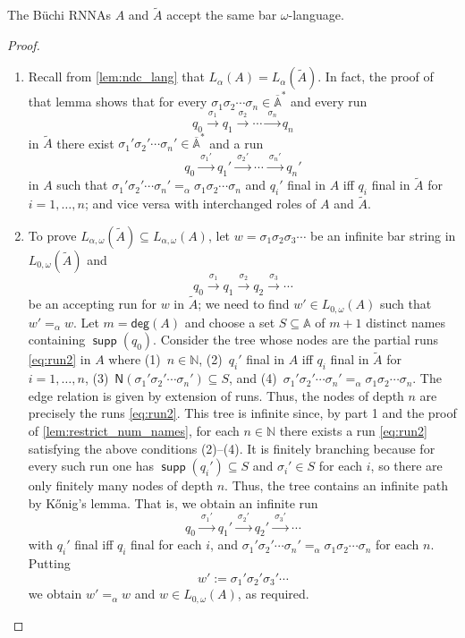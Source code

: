 \documentclass[10pt,a4paper]{amsart}
\newcommand{\Names}[1]{\mathsf{N}(#1)}
\newcommand{\degree}{\mathsf{deg}}
\newcommand{\barA}{\overline{\names}}
\numberwithin{equation}{section}
\newcommand{\xto}[1]{\xrightarrow{~#1~}}
\newcommand{\seq}{\subseteq}
\newcommand{\tl}{\widetilde}
\newcommand{\Nat}{{\mathbb{N}}}
\newcommand{\+}[1]{\mathcal{#1}\xspace}
\newcommand{\names}{\mathbb{A}}
\DeclareMathOperator{\supp}{\mathsf{supp}} %
\theoremstyle{definition}
\begin{document}
%
\begin{lemma}\label{lem:alpha_lang_buechi}
  The Büchi RNNAs $A$ and $\tl A$ accept the same bar
  $\omega$-language.%
\end{lemma}
%
\begin{proof}
  \begin{enumerate}
  \item Recall from \autoref{lem:ndc_lang} that
    $L_\alpha(A)=L_\alpha(\tl{A})$. In fact, the proof of that lemma
    shows that for every $\sigma_1\sigma_2\cdots \sigma_n\in \barA^*$
    and every run
    \[
      q_0\xto{\sigma_1} q_1\xto{\sigma_2} \cdots \xto{\sigma_n} q_n
    \]
    in $\tl{A}$ there exist $\sigma_1'\sigma_2'\cdots \sigma_n'\in \barA^*$ and a run
    \begin{equation}\label{eq:run2}
      q_0\xto{\sigma_1'} q_1'\xto{\sigma_2'} \cdots \xto{\sigma_n'}
      q_n'
    \end{equation}
    in ${A}$ such that
    $\sigma_1'\sigma_2'\cdots \sigma_n'=_\alpha \sigma_1\sigma_2\cdots
    \sigma_n$ and $q_i'$ final in $A$ iff $q_i$ final in $\tl{A}$ for
    $i=1,\ldots, n$; and vice versa with interchanged roles of $A$ and
    $\tl{A}$.
    
  \item To prove $L_{\alpha,\omega}(\tl{A})\seq L_{\alpha,\omega}(A)$,
    let $w=\sigma_1\sigma_2\sigma_3\cdots$ be an infinite bar string
    in $L_{0,\omega}(\tl{A})$ and %
    \[
      q_0\xto{\sigma_1} q_1\xto{\sigma_2} q_2 \xto{\sigma_3}\cdots
    \]
    be an accepting run for $w$ in $\tl{A}$; we need to find $w'\in
    L_{0,\omega}(A)$ such that $w'=_\alpha w$. Let
    $m=\degree(A)$ and choose a set $S\seq \names$ of
    $m+1$ distinct names containing
    $\supp(q_0)$. Consider the tree whose nodes are the partial runs
    \eqref{eq:run2} in $A$ where (1)~$n\in \Nat$,
    (2)~$q_i'$ final in $A$ iff
    $q_i$ final in $\tl{A}$ for $i=1,\ldots, n$, (3)~$\Names{\sigma_1'\sigma_2'\cdots \sigma_n'}\seq S$, and (4)~$\sigma_1'\sigma_2'\cdots \sigma_n'=_\alpha
    \sigma_1\sigma_2\cdots
    \sigma_n$. The edge relation is given by extension of runs. Thus,
    the nodes of depth
    $n$ are precisely the runs \eqref{eq:run2}. This tree is infinite
    since, by part 1 and the proof of \autoref{lem:restrict_num_names},
    for each $n\in
    \Nat$ there exists a run \eqref{eq:run2} satisfying the above
    conditions \mbox{(2)--(4)}. It is finitely branching because for
    every such run one has $\supp(q_i')\seq S$ and $\sigma_i'\in
    S$ for each
    $i$, so there are only finitely many nodes of depth
    $n$. Thus, the tree contains an infinite path by K\H{o}nig's
    lemma. That is, we obtain an infinite run
    \[
      q_0\xto{\sigma_1'} q_1'\xto{\sigma_2'} q_2'\xto{\sigma_3'}\cdots
    \]
    with $q_i'$ final iff $q_i$ final for each $i$, and
    $\sigma_1'\sigma_2'\cdots \sigma_n'=_\alpha \sigma_1\sigma_2\cdots
    \sigma_n$ for each $n$. Putting
    \[
      w':= \sigma_1'\sigma_2'\sigma_3'\cdots
    \]
    we obtain $w'=_\alpha w$ and $w\in L_{0,\omega}(A)$, as required.
    

\end{enumerate}
\end{proof}
\end{document}
